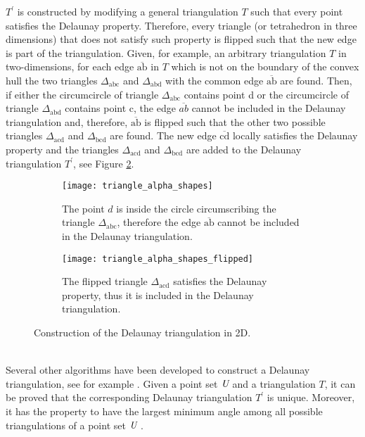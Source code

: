 $T^\prime$ is constructed by modifying a general triangulation $T$ such that every point satisfies the Delaunay property. 
Therefore, every triangle (or tetrahedron in three dimensions) that does not satisfy such property is flipped such that the new edge is part of the triangulation. 
Given, for example, an arbitrary triangulation $T$ in two-dimensions, for each edge $\overline{\textrm{ab}}$ in $T$ which is not on the boundary of the convex hull the two triangles 
$\Delta_{\textrm{abc}}$ and $\Delta_{\textrm{abd}}$ with the common edge $\overline{\textrm{ab}}$ are found. Then, if either the circumcircle of triangle $\Delta_{\textrm{abc}}$ contains point \textrm{d} or the circumcircle of triangle $\Delta_{\textrm{abd}}$ contains point \textrm{c}, the edge $\overline{ab}$ cannot be included in the Delaunay triangulation and, therefore, $\overline{\textrm{ab}}$ is flipped such that the other two possible triangles $\Delta_{\textrm{acd}}$ and $\Delta_{\textrm{bcd}}$ are found. The new edge $\overline{\textrm{cd}}$ locally satisfies the Delaunay property and the triangles $\Delta_{\textrm{acd}}$ and  $\Delta_{\textrm{bcd}}$ are added to the Delaunay triangulation $T^\prime$, see Figure \ref{fig:Delaunay}.  
\begin{figure}[t]\label{fig:Delaunay}
\begin{subfigure}[t]{0.48\textwidth}
\centering
\texttt{[image: triangle\_alpha\_shapes]}
\label{fig:shape}
\caption{The point $d$ is inside the circle circumscribing the triangle $\Delta_{\textrm{abc}}$, therefore the edge $\overline{\textrm{ab}}$ cannot be included in the Delaunay triangulation.}
\end{subfigure}
\hfill
\begin{subfigure}[t]{0.48\textwidth}
\centering
\texttt{[image: triangle\_alpha\_shapes\_flipped]}
\caption{The flipped triangle $\Delta_{\textrm{acd}}$ satisfies the Delaunay property, thus it is included in the Delaunay triangulation.}
\end{subfigure}
\caption{Construction of the Delaunay triangulation in 2D.}
\label{fig:Delaunay}
\end{figure}
\\ \indent Several other algorithms have been developed to construct a Delaunay triangulation, see for example \cite{lee1980two, renka1997algorithm}.
 Given a point set $\emph{U}$ and a triangulation $T$, it can be proved that the corresponding Delaunay triangulation $T^\prime$ is unique. Moreover, it has the property to have the largest minimum angle among all possible triangulations of a point set $\emph{U}$ \cite{press2007numerical}.
